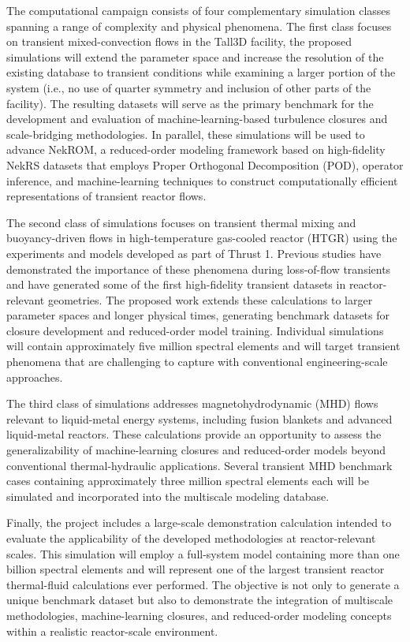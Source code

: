 The computational campaign consists of four complementary simulation classes spanning a range of complexity and physical phenomena. The first class focuses on transient mixed-convection flows in the Tall3D facility, the proposed simulations will extend the parameter space and increase the resolution of the existing database to transient conditions while examining a larger portion of the system (i.e., no use of quarter symmetry and inclusion of other parts of the facility). The resulting datasets will serve as the primary benchmark for the development and evaluation of machine-learning-based turbulence closures and scale-bridging methodologies. In parallel, these simulations will be used to advance NekROM, a reduced-order modeling framework based on high-fidelity NekRS datasets that employs Proper Orthogonal Decomposition (POD), operator inference, and machine-learning techniques to construct computationally efficient representations of transient reactor flows.

The second class of simulations focuses on transient thermal mixing and buoyancy-driven flows in high-temperature gas-cooled reactor (HTGR) using the experiments and models developed as part of Thrust 1. Previous studies have demonstrated the importance of these phenomena during loss-of-flow transients and have generated some of the first high-fidelity transient datasets in reactor-relevant geometries. The proposed work extends these calculations to larger parameter spaces and longer physical times, generating benchmark datasets for closure development and reduced-order model training. Individual simulations will contain approximately five million spectral elements and will target transient phenomena that are challenging to capture with conventional engineering-scale approaches.

The third class of simulations addresses magnetohydrodynamic (MHD) flows relevant to liquid-metal energy systems, including fusion blankets and advanced liquid-metal reactors. These calculations provide an opportunity to assess the generalizability of machine-learning closures and reduced-order models beyond conventional thermal-hydraulic applications. Several transient MHD benchmark cases containing approximately three million spectral elements each will be simulated and incorporated into the multiscale modeling database.

Finally, the project includes a large-scale demonstration calculation intended to evaluate the applicability of the developed methodologies at reactor-relevant scales. This simulation will employ a full-system model containing more than one billion spectral elements and will represent one of the largest transient reactor thermal-fluid calculations ever performed. The objective is not only to generate a unique benchmark dataset but also to demonstrate the integration of multiscale methodologies, machine-learning closures, and reduced-order modeling concepts within a realistic reactor-scale environment. 

